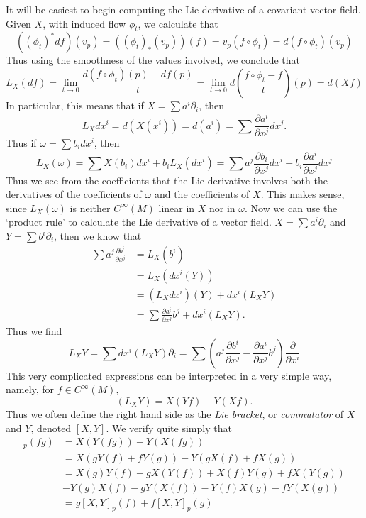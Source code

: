 It will be easiest to begin computing the Lie derivative of a covariant vector field. Given $X$, with induced flow $\phi_t$, we calculate that
%
\[ ((\phi_t)^*df)(v_p) = ((\phi_t)_*(v_p))(f) = v_p(f \circ \phi_t) = d(f \circ \phi_t)(v_p) \]
%
Thus using the smoothness of the values involved, we conclude that
%
\[ L_X(df) = \lim_{t \to 0} \frac{d(f \circ \phi_t)(p) - df(p)}{t} = \lim_{t \to 0} d \left( \frac{f \circ \phi_t - f}{t} \right)(p) = d(Xf) \]
%
In particular, this means that if $X = \sum a^i \partial_i$, then
%
\[ L_X dx^i = d(X(x^i)) = d(a^i) = \sum \frac{\partial a^i}{\partial x^j} dx^j. \]
%
Thus if $\omega = \sum b_i dx^i$, then
%
\[ L_X(\omega) = \sum X(b_i) dx^i + b_i L_X(dx^i) = \sum a^j \frac{\partial b_i}{\partial x^j} dx^i + b_i \frac{\partial a^i}{\partial x^j} dx^j \]
%
Thus we see from the coefficients that the Lie derivative involves both the derivatives of the coefficients of $\omega$ and the coefficients of $X$. This makes sense, since $L_X(\omega)$ is neither $C^\infty(M)$ linear in $X$ nor in $\omega$. Now we can use the `product rule' to calculate the Lie derivative of a vector field. $X = \sum a^i \partial_i$ and $Y = \sum b^i \partial_i$, then we know that
%
\begin{align*}
    \sum a^j \frac{\partial b^i}{\partial x^j} &= L_X(b^i) \\
    &= L_X(dx^i(Y))\\
    &= (L_X dx^i)(Y) + dx^i(L_X Y)\\
    &= \sum \frac{\partial a^i}{\partial x^j} b^j + dx^i(L_X Y).
\end{align*}
%
Thus we find
%
\[ L_X Y = \sum dx^i(L_X Y) \partial_i = \sum \left( a^j \frac{\partial b^i}{\partial x^j} - \frac{\partial a^i}{\partial x^j} b^j \right) \frac{\partial}{\partial x^i} \]
%
This very complicated expressions can be interpreted in a very simple way, namely, for $f \in C^\infty(M)$,
%
\[ (L_X Y) = X(Yf) - Y(Xf). \]
%
Thus we often define the right hand side as the \emph{Lie bracket}, or \emph{commutator} of $X$ and $Y$, denoted $[X,Y]$. We verify quite simply that
%
\begin{align*}
    [X,Y]_p(fg) &= X(Y(fg)) - Y(X(fg))\\
    &= X(gY(f) + fY(g)) - Y(gX(f) + fX(g))\\
    &= X(g)Y(f) + gX(Y(f)) + X(f)Y(g) + fX(Y(g))\\
    &- Y(g)X(f) - gY(X(f)) - Y(f)X(g) - fY(X(g))\\
    &= g [X,Y]_p(f) + f [X,Y]_p(g)
\end{align*}
%
